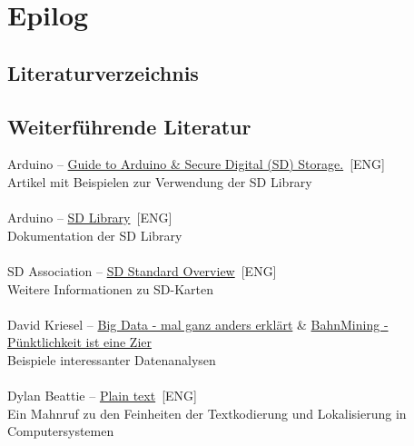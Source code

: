 \documentclass[ngerman]{schoolPres}
\begin{document}
  \section{Epilog}%
  \subsection{Literaturverzeichnis}%
  \begin{frame}
    \printbibliography
  \end{frame}

  \subsection{Weiterführende Literatur}%
  \begin{frame}

    Arduino -- \href{https://docs.arduino.cc/learn/programming/sd-guide}{Guide to Arduino \& Secure Digital (SD) Storage.}~[ENG]\\
    \hspace{1em} {\footnotesize Artikel mit Beispielen zur Verwendung der SD Library}\\~\\

    Arduino -- \href{hhttps://www.arduino.cc/reference/en/libraries/sd/}{SD Library}~[ENG]\\
    \hspace{1em} {\footnotesize Dokumentation der SD Library}\\~\\

    SD Association -- \href{https://www.sdcard.org/developers/}{SD Standard Overview}~[ENG]\\
    \hspace{1em} {\footnotesize Weitere Informationen zu SD-Karten}\\~\\

    David Kriesel -- \href{https://youtu.be/\_Pd5sXXMMLI}{Big Data - mal ganz anders erklärt} \& \href{https://youtu.be/0rb9CfOvojk}{BahnMining - Pünktlichkeit ist eine Zier}\\
    \hspace{1em} {\footnotesize Beispiele interessanter Datenanalysen}\\~\\

    Dylan Beattie -- \href{https://youtu.be/gd5uJ7Nlvvo}{Plain text}~[ENG]\\
    \hspace{1em} {\footnotesize Ein Mahnruf zu den Feinheiten der Textkodierung und Lokalisierung in Computersystemen}
  \end{frame}
\end{document}
